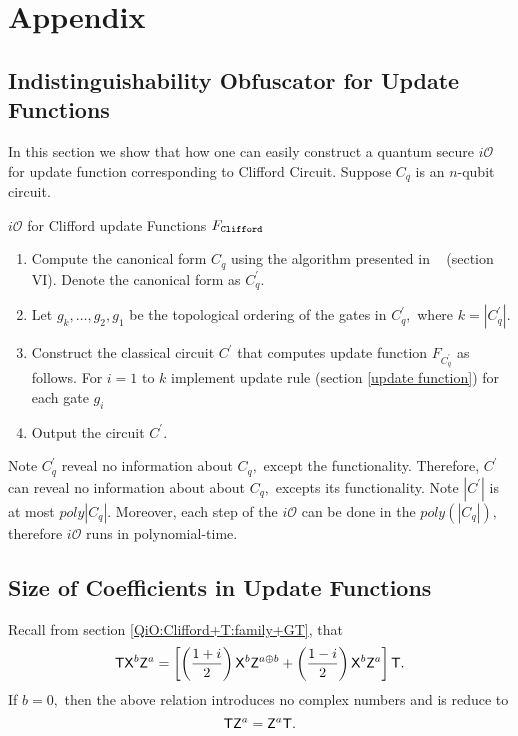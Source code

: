 \section{Appendix} 
\label{sec:appendix}
 \subsection{Indistinguishability Obfuscator for Update Functions}
 \label{sec: iO-clifford-functions}
 In this section we show that how one can easily construct a quantum secure $i\mathcal{O}$ for update function corresponding to Clifford Circuit. Suppose $C_q$ is an $n$-qubit circuit.
\begin{algorithm}[H]
  \caption{$i\mathcal{O}$ for Clifford update Functions $F_{\tt Clifford}$}
  \begin{enumerate}
  \item Compute the canonical form $C_q$ using the algorithm presented in ~\cite{AG04} (section VI). Denote the canonical form as $C_q^\prime.$
  \item Let $g_k, \ldots,g_2,g_1$ be the topological ordering of the gates in $C_q^\prime,$ where $k=|C_q^\prime|.$
  \item Construct the classical circuit $C^\prime$ that computes update function $F_{C_q^\prime}$ as follows. For $i=1$ to $k$ implement update rule (section \ref{update function})  for each gate $g_i$
  \item Output the circuit $C^\prime.$
  \end{enumerate}
\end{algorithm}
%
\noindent Note $C_q^\prime$ reveal no information about $C_q,$ except the functionality. Therefore, $C^\prime$ can reveal no information about about $C_q,$ excepts its functionality. Note $|C^\prime|$ is at most $poly|C_q|.$ Moreover, each step of the $i\mathcal{O}$ can be done in the $poly(|C_q|),$ therefore $i\mathcal{O}$ runs in polynomial-time.



 \subsection{Size of Coefficients in Update Functions}
 \label{coeff:size}
 Recall from section \ref{QiO:Clifford+T:family+GT}, that
 \begin{equation}
  \label{eq1:1qubit-size}
\begin{aligned}
{\sf T} {\sf X}^b {\sf Z}^a=\left[\left(\frac{1+i}{2}\right) {\sf X}^b {\sf Z}^{a\oplus b} + \left(\frac{1-i}{2}\right){\sf X}^b {\sf Z}^a\right] {\sf T}. \\
\end{aligned}
\end{equation}
If $b=0,$ then the above relation introduces no complex numbers and is reduce to
\begin{equation*}
{\sf T} {\sf Z}^a=  {\sf Z}^{a} {\sf T}. 
\end{equation*}
 
